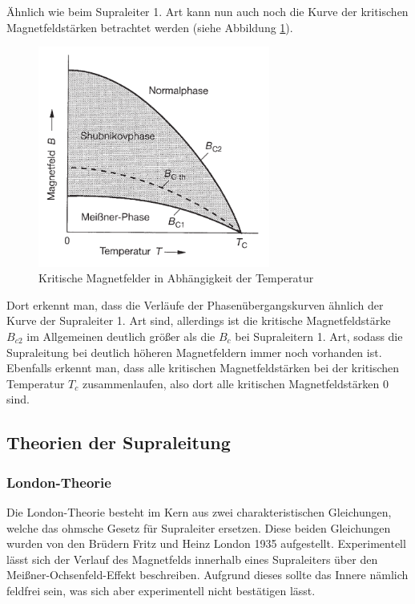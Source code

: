 Ähnlich wie beim Supraleiter 1. Art kann nun auch noch die Kurve der kritischen Magnetfeldstärken betrachtet werden (siehe Abbildung \ref{2.art2}).
\begin{figure}[htbp]  
     \includegraphics[width=0.68\textwidth]{2_art2.png}
  \caption{Kritische Magnetfelder in Abhängigkeit der Temperatur \cite{supraleitung}}
  \label{2.art2}
\end{figure}
Dort erkennt man, dass die Verläufe der Phasenübergangskurven ähnlich der Kurve der Supraleiter 1. Art sind, allerdings ist die kritische Magnetfeldstärke $B_{c2}$ im Allgemeinen deutlich größer als die $B_c$ bei Supraleitern 1. Art, sodass die Supraleitung bei deutlich höheren Magnetfeldern immer noch vorhanden ist. Ebenfalls erkennt man, dass alle kritischen Magnetfeldstärken bei der kritischen Temperatur $T_c$ zusammenlaufen, also dort alle kritischen Magnetfeldstärken $0$ sind.


\subsection{Theorien der Supraleitung} \label{theorien}
\subsubsection{London-Theorie}
Die London-Theorie besteht im Kern aus zwei charakteristischen Gleichungen, welche das ohmsche Gesetz für Supraleiter ersetzen. Diese beiden Gleichungen wurden von den Brüdern Fritz und Heinz London 1935 aufgestellt. Experimentell lässt sich der Verlauf des Magnetfelds innerhalb eines Supraleiters über den Meißner-Ochsenfeld-Effekt beschreiben. Aufgrund dieses sollte das Innere nämlich feldfrei sein, was sich aber experimentell nicht bestätigen lässt.

